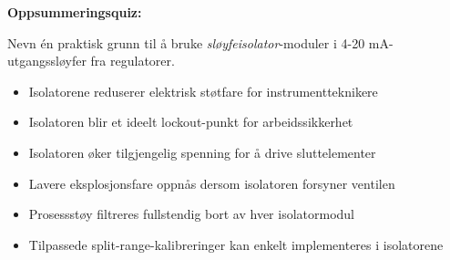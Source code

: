 \vfil \eject

\noindent
{\bf Oppsummeringsquiz:}

Nevn én praktisk grunn til å bruke {\it sløyfeisolator}-moduler i 4-20 mA-utgangssløyfer fra regulatorer.

\begin{itemize}
\item{} Isolatorene reduserer elektrisk støtfare for instrumentteknikere
\vskip 5pt 
\item{} Isolatoren blir et ideelt lockout-punkt for arbeidssikkerhet
\vskip 5pt 
\item{} Isolatoren øker tilgjengelig spenning for å drive sluttelementer
\vskip 5pt 
\item{} Lavere eksplosjonsfare oppnås dersom isolatoren forsyner ventilen
\vskip 5pt 
\item{} Prosessstøy filtreres fullstendig bort av hver isolatormodul
\vskip 5pt 
\item{} Tilpassede split-range-kalibreringer kan enkelt implementeres i isolatorene
\end{itemize}




